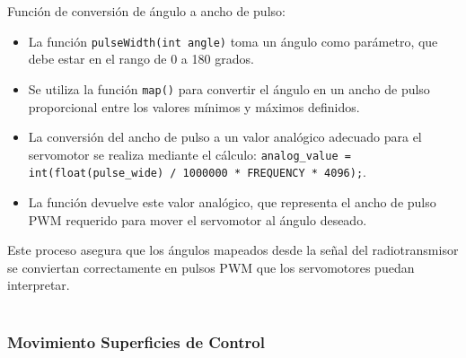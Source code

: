         Función de conversión de ángulo a ancho de pulso:\\

        \begin{itemize}
        \item La función \texttt{pulseWidth(int angle)} toma un ángulo como parámetro, que debe estar en el rango de 0 a 180 grados.
        \item Se utiliza la función \texttt{map()} para convertir el ángulo en un ancho de pulso proporcional entre los valores mínimos y máximos definidos.
        \item La conversión del ancho de pulso a un valor analógico adecuado para el servomotor se realiza mediante el cálculo: \texttt{analog\_value = int(float(pulse\_wide) / 1000000 * FREQUENCY * 4096);}.
        \item La función devuelve este valor analógico, que representa el ancho de pulso PWM requerido para mover el servomotor al ángulo deseado.
        \end{itemize}
        
        Este proceso asegura que los ángulos mapeados desde la señal del radiotransmisor se conviertan correctamente en pulsos PWM que los servomotores puedan interpretar. \\ \\


        \subsubsection{Movimiento Superficies de Control}

